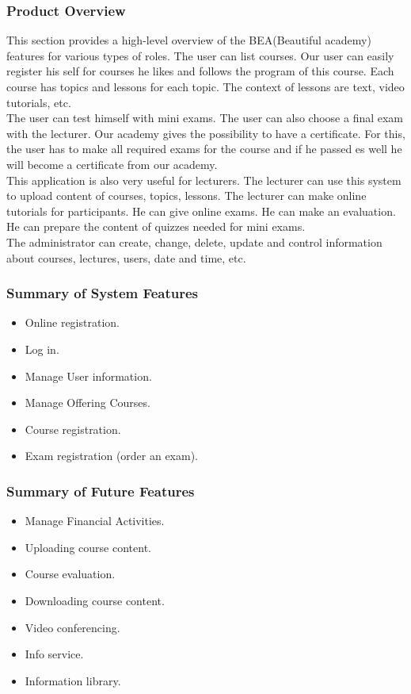 \documentclass{scrartcl}
\begin{document}
  
  	\subsubsection{Product Overview}
  
  	This section provides a high-level overview of the BEA(Beautiful academy) features for various types of roles.
 The user can list courses. 
 Our user can easily register his self for courses he likes and follows the program of this course. Each course has topics and lessons for each topic. The context of lessons are text, video tutorials, etc. \\
  	The user can test himself with mini exams. The user can also choose a final exam with the lecturer. Our academy gives the possibility to have a certificate. For this, the user has to make all required exams for the course and if he passed es well he will become a certificate from our academy. \\
  	This application is also very useful for lecturers. The lecturer can use this system to upload content of courses, topics, lessons. The lecturer can make online tutorials for participants. He can give online exams. He can make an evaluation. He can prepare the content of quizzes needed for mini exams.\\
  	The administrator can create, change, delete, update and control information about courses, lectures, users, date and time, etc.
  	
  	
  	\subsubsection{Summary of System Features}
  	
  	\begin{itemize}
  	\item Online registration.
  	\item Log in.
  	\item Manage User information.
  	\item Manage Offering Courses.
  	\item Course registration.
  	\item Exam registration (order an exam).
  	\end{itemize}
  	
  	\subsubsection{Summary of Future Features}
  	\begin{itemize}
  	\item Manage Financial Activities.
  	\item Uploading course content.
  	\item Course evaluation.
  	\item Downloading course content.
  	\item Video conferencing.
  	\item Info service.
  	\item Information library.
  	\end{itemize}
  	
\end{document}
